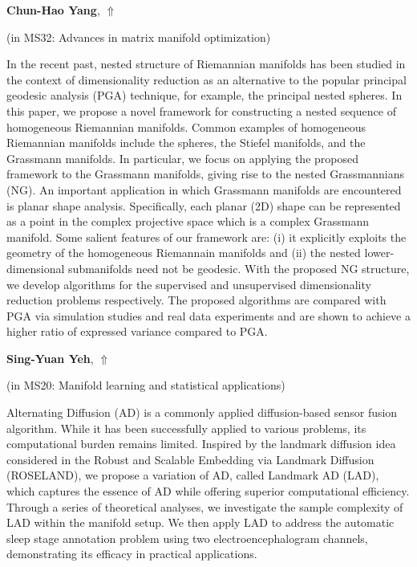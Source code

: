 \documentclass[ILAS2025-program.tex]{subfiles}
\begin{document}
     \hypertarget{down0185}{}\begin{ilasabstract}
    
    \textbf{Chun-Hao Yang},  \hfill \hyperlink{up0185}{$\Uparrow$}
    
    (in {\color{mstitle}MS32: Advances in matrix manifold optimization})
        
        \mtskip
    In the recent past, nested structure of Riemannian manifolds has been studied in the context of dimensionality reduction as an alternative to the popular principal geodesic analysis (PGA) technique, for example, the principal nested spheres. In this paper, we propose a novel framework for constructing a nested sequence of homogeneous Riemannian manifolds. Common examples of homogeneous Riemannian manifolds include the spheres, the Stiefel manifolds, and the Grassmann manifolds. In particular, we focus on applying the proposed framework to the Grassmann manifolds, giving rise to the nested Grassmannians (NG). An important application in which Grassmann manifolds are encountered is planar shape analysis. Specifically, each planar (2D) shape can be represented as a point in the complex projective space which is a complex Grassmann manifold. Some salient features of our framework are: (i) it explicitly exploits the geometry of the homogeneous Riemannain manifolds and (ii) the nested lower-dimensional submanifolds need not be geodesic. With the proposed NG structure, we develop algorithms for the supervised and unsupervised dimensionality reduction problems respectively. The proposed algorithms are compared with PGA via simulation studies and real data experiments and are shown to achieve a higher ratio of expressed variance compared to PGA.
\end{ilasabstract}
     \hypertarget{down0150}{}\begin{ilasabstract}
    
    \textbf{Sing-Yuan Yeh},  \hfill \hyperlink{up0150}{$\Uparrow$}
    
    (in {\color{mstitle}MS20: Manifold learning and statistical applications})
        
        \mtskip
    Alternating Diffusion (AD) is a commonly applied diffusion-based sensor fusion algorithm. While it has been successfully applied to various problems, its computational burden remains limited. Inspired by the landmark diffusion idea considered in the Robust and Scalable Embedding via Landmark Diffusion (ROSELAND), we propose a variation of AD, called Landmark AD (LAD), which captures the essence of AD while offering superior computational efficiency. Through a series of theoretical analyses, we investigate the sample complexity of LAD within the manifold setup. We then apply LAD to address the automatic sleep stage annotation problem using two electroencephalogram channels, demonstrating its efficacy in practical applications.
\end{ilasabstract}
\end{document}
